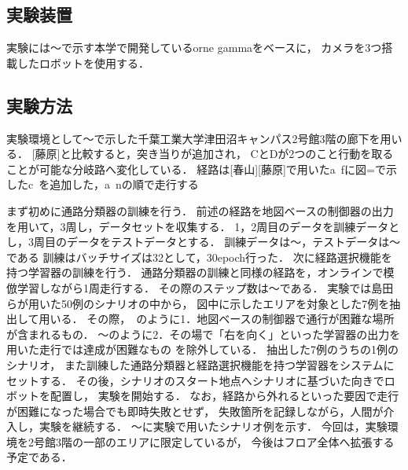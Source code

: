 \documentclass{sice-si}
\begin{document}
\subsection{実験装置}
実験には〜で示す本学で開発しているorne gammaをベースに，
カメラを3つ搭載したロボットを使用する．

\subsection{実験方法}
実験環境として〜で示した千葉工業大学津田沼キャンパス2号館3階の廊下を用いる．
[藤原]と比較すると，突き当りが追加され，
CとDが2つのこと行動を取ることが可能な分岐路へ変化している．
経路は[春山][藤原]で用いたa~fに図=で示したc~を追加した，a~nの順で走行する

まず初めに通路分類器の訓練を行う．
前述の経路を地図ベースの制御器の出力を用いて，3周し，データセットを収集する．
1，2周目のデータを訓練データとし，3周目のデータをテストデータとする．
訓練データは〜，テストデータは〜である
訓練はバッチサイズは32として，30epoch行った．
次に経路選択機能を持つ学習器の訓練を行う．
通路分類器の訓練と同様の経路を，オンラインで模倣学習しながら1周走行する．
その際のステップ数は〜である．
実験では島田らが用いた50例のシナリオの中から，
図中に示したエリアを対象とした7例を抽出して用いる．
その際，~のように1．地図ベースの制御器で通行が困難な場所が含まれるもの．
〜のように2．その場で「右を向く」といった学習器の出力を用いた走行では達成が困難なもの
を除外している．
抽出した7例のうちの1例のシナリオ，
また訓練した通路分類器と経路選択機能を持つ学習器をシステムにセットする．
その後，シナリオのスタート地点へシナリオに基づいた向きでロボットを配置し，
実験を開始する．
なお，経路から外れるといった要因で走行が困難になった場合でも即時失敗とせず，
失敗箇所を記録しながら，人間が介入し，実験を継続する．
〜に実験で用いたシナリオ例を示す．
今回は，実験環境を2号館3階の一部のエリアに限定しているが，
今後はフロア全体へ拡張する予定である．

\end{document}
